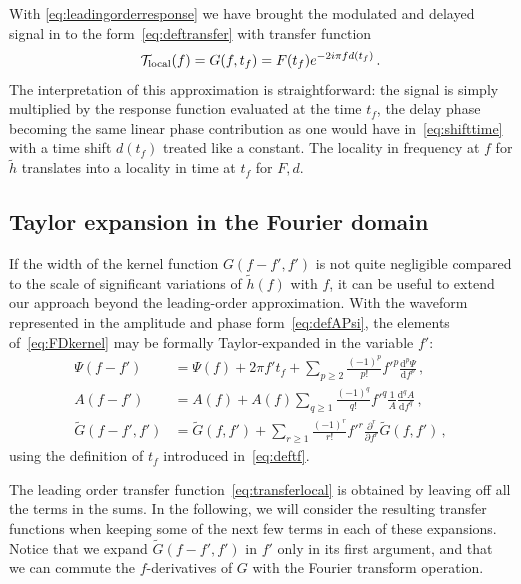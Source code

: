\documentclass[aps,showpacs,twocolumn,
prd,superscriptaddress,nofootinbib]{revtex4-1}
\newcommand{\be}{\begin{equation}}
\newcommand{\ee}{\end{equation}}
\newcommand\ud{{\mathrm{d}}}
\newcommand\calT{{\mathcal{T}}}
\newcommand{\tf}{t_{f}}
\begin{document}
With \eqref{eq:leadingorderresponse} we have brought the modulated and delayed signal in to the form~\eqref{eq:deftransfer} with transfer function
\be\label{eq:transferlocal}
	\calT_{\rm local}(f) = G(f, \tf) = F(t_{f}) e^{-2i\pi f d(t_{f})}\,.
\ee
The interpretation of this approximation is straightforward: the signal is simply multiplied by the response function evaluated at the time $\tf$, the delay phase becoming the same linear phase contribution as one would have in~\eqref{eq:shifttime} with a time shift $d(t_{f})$ treated like a constant. The locality in frequency at $f$ for $\tilde{h}$ translates into a locality in time at $t_{f}$ for $F,d$.


\subsection{Taylor expansion in the Fourier domain}
\label{subsec:TaylorFD}

If the width of the kernel function $G(f-f',f')$ is not quite negligible compared to the scale of significant variations of $\tilde{h}(f)$ with $f$, it can be useful to extend our approach beyond the leading-order approximation. With the waveform represented in the amplitude and phase form~\eqref{eq:defAPsi}, the elements of~\eqref{eq:FDkernel} may be formally Taylor-expanded in the variable $f'$:
\begin{subequations}\label{eq:expandfprime}
\begin{align}
	\Psi(f-f') &= \Psi(f) + 2\pi f' \tf + \sum\limits_{p\geq 2} \frac{(-1)^{p}}{p!} {f'}^{p} \frac{\ud^{p} \Psi}{\ud f^{p}} \,, \label{eq:expandPsi}\\
	A(f-f') &= A(f)+A(f) \sum\limits_{q\geq 1} \frac{(-1)^{q}}{q!} {f'}^{q} \frac{1}{A}\frac{\ud^{q} A}{\ud f^{q}} \,, \label{eq:expandA}\\
	\tilde{G}(f-f', f') &=\tilde G(f,f')+ \sum\limits_{r\geq 1} \frac{(-1)^{r}}{r!} {f'}^{r} \frac{\partial^{r} }{\partial f^{r}}  \tilde{G}(f,f') \label{eq:expandG} \,,
\end{align}
\end{subequations}
using the definition of $t_{f}$ introduced in~\eqref{eq:deftf}.

The leading order transfer function~\eqref{eq:transferlocal} is obtained by leaving off all the terms in the sums.  In the following, we will consider the resulting transfer functions when keeping some of the next few terms in each of these expansions. Notice that we expand $\tilde{G}(f-f',f')$ in $f'$ only in its first argument, and that we can commute the $f$-derivatives of $G$ with the Fourier transform operation.
\end{document}
